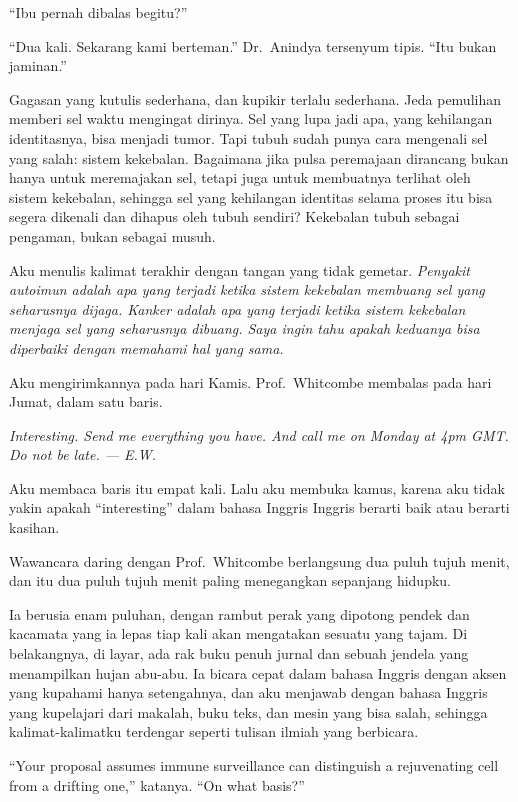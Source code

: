 \documentclass[11pt,twoside,openany]{book}
\makeatletter
\newcommand{\scenebreak}{\par\vspace{0.9em}{\centering\textsc{*\hspace{0.7em}*\hspace{0.7em}*}\par}\vspace{0.9em}\@afterindentfalse\@afterheading}
\makeatother
\begin{document}
``Ibu pernah dibalas begitu?''

``Dua kali. Sekarang kami berteman.'' Dr.~Anindya tersenyum tipis. ``Itu bukan jaminan.''

Gagasan yang kutulis sederhana, dan kupikir terlalu sederhana. Jeda pemulihan memberi sel waktu mengingat dirinya. Sel yang lupa jadi apa, yang kehilangan identitasnya, bisa menjadi tumor. Tapi tubuh sudah punya cara mengenali sel yang salah: sistem kekebalan. Bagaimana jika pulsa peremajaan dirancang bukan hanya untuk meremajakan sel, tetapi juga untuk membuatnya terlihat oleh sistem kekebalan, sehingga sel yang kehilangan identitas selama proses itu bisa segera dikenali dan dihapus oleh tubuh sendiri? Kekebalan tubuh sebagai pengaman, bukan sebagai musuh.

Aku menulis kalimat terakhir dengan tangan yang tidak gemetar. \emph{Penyakit autoimun adalah apa yang terjadi ketika sistem kekebalan membuang sel yang seharusnya dijaga. Kanker adalah apa yang terjadi ketika sistem kekebalan menjaga sel yang seharusnya dibuang. Saya ingin tahu apakah keduanya bisa diperbaiki dengan memahami hal yang sama.}

Aku mengirimkannya pada hari Kamis. Prof.~Whitcombe membalas pada hari Jumat, dalam satu baris.

\emph{Interesting. Send me everything you have. And call me on Monday at 4pm GMT. Do not be late. --- E.W.}

Aku membaca baris itu empat kali. Lalu aku membuka kamus, karena aku tidak yakin apakah ``interesting'' dalam bahasa Inggris Inggris berarti baik atau berarti kasihan.

\scenebreak
Wawancara daring dengan Prof.~Whitcombe berlangsung dua puluh tujuh menit, dan itu dua puluh tujuh menit paling menegangkan sepanjang hidupku.

Ia berusia enam puluhan, dengan rambut perak yang dipotong pendek dan kacamata yang ia lepas tiap kali akan mengatakan sesuatu yang tajam. Di belakangnya, di layar, ada rak buku penuh jurnal dan sebuah jendela yang menampilkan hujan abu-abu. Ia bicara cepat dalam bahasa Inggris dengan aksen yang kupahami hanya setengahnya, dan aku menjawab dengan bahasa Inggris yang kupelajari dari makalah, buku teks, dan mesin yang bisa salah, sehingga kalimat-kalimatku terdengar seperti tulisan ilmiah yang berbicara.

``Your proposal assumes immune surveillance can distinguish a rejuvenating cell from a drifting one,'' katanya. ``On what basis?''
\end{document}
